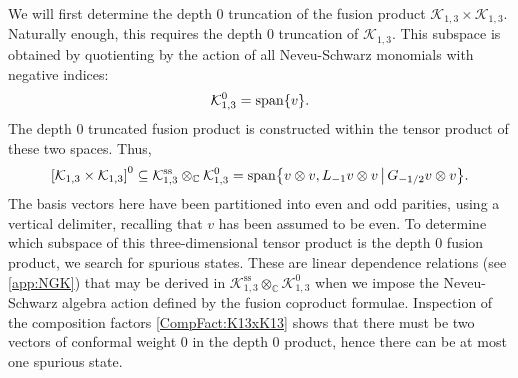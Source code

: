 \documentclass[a4paper,reqno,12pt]{report}
\theoremstyle{definition}
\numberwithin{equation}{section}
\let\originalleft\left     %
\let\originalright\right
\renewcommand{\left}{\mathopen{}\mathclose\bgroup\originalleft}
\renewcommand{\right}{\aftergroup\egroup\originalright}
\newcommand{\sqbrac}[1]{\left[ #1 \right]}
\newcommand{\set}[1]{\left\{ #1 \right\}}
\newcommand{\CC}{\mathbb{C}}
\newcommand{\Kac}[1]{\mathcal{K}_{#1}}       %
\newcommand{\spsub}[1]{#1^{\text{ss}}}       %
\newcommand{\fuse}{\mathbin{\times}}                                            %
\newcommand{\ns}{Neveu-Schwarz}
\DeclareMathOperator{\vspn}{span}
\theoremstyle{plain}
\begin{document}
We will first determine the depth $0$ truncation of the fusion product $\Kac{1,3} \fuse \Kac{1,3}$.  Naturally enough, this requires the depth $0$ truncation of $\Kac{1,3}$.  This subspace is obtained by quotienting by the action of all \ns{} monomials with negative indices:
\begin{equation}
\Kac{1,3}^0 = \vspn \set{v}.
\end{equation}
The depth $0$ truncated fusion product is constructed within the tensor product of these two spaces.  Thus,
\begin{equation} \label{eq:BasisK13xK13}
\sqbrac{\Kac{1,3} \fuse \Kac{1,3}}^0 \subseteq \spsub{\Kac{1,3}} \otimes_{\CC} \Kac{1,3}^0 = \vspn \set{v \otimes v, L_{-1} v \otimes v \,\middle\vert\, G_{-1/2} v \otimes v}.
\end{equation}
The basis vectors here have been partitioned into even and odd parities, using a vertical delimiter, recalling that $v$ has been assumed to be even.  To determine which subspace of this three-dimensional tensor product is the depth $0$ fusion product, we search for spurious states.  These are linear dependence relations (see \cref{app:NGK}) that may be derived in $\spsub{\Kac{1,3}} \otimes_{\CC} \Kac{1,3}^0$ when we impose the \ns{} algebra action defined by the fusion coproduct formulae.  Inspection of the composition factors \eqref{CompFact:K13xK13} shows that there must be two vectors of conformal weight $0$ in the depth $0$ product, hence there can be at most one spurious state.
\end{document}
